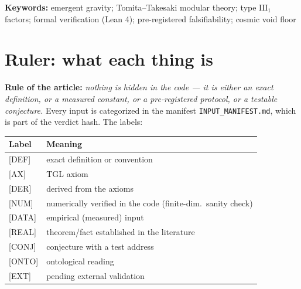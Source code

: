 \documentclass[11pt]{article}
\theoremstyle{definition}\newtheorem{deriv}{Derivation}
\begin{document}
\noindent\textbf{Keywords:} emergent gravity; Tomita--Takesaki modular theory; type $\mathrm{III}_1$ factors; formal verification (Lean 4); pre-registered falsifiability; cosmic void floor\par\vspace{4pt}

\clearpage\tableofcontents\clearpage

\section*{Ruler: what each thing is}

\noindent\textbf{Rule of the article:} \emph{nothing is hidden in the code --- it is either an exact definition, or a measured constant, or a pre-registered protocol, or a testable conjecture.} Every input is categorized in the manifest \texttt{INPUT\_MANIFEST.md}, which is part of the verdict hash. The labels:

\begin{center}\small\begin{tabular}{ll}\toprule

Label & Meaning\\\midrule

\textsf{[DEF]} & exact definition or convention\\

\textsf{[AX]} & TGL axiom\\

\textsf{[DER]} & derived from the axioms\\

\textsf{[NUM]} & numerically verified in the code (finite-dim.\ sanity check)\\

\textsf{[DATA]} & empirical (measured) input\\

\textsf{[REAL]} & theorem/fact established in the literature\\

\textsf{[CONJ]} & conjecture with a test address\\

\textsf{[ONTO]} & ontological reading\\

\textsf{[EXT]} & pending external validation\\\bottomrule

\end{tabular}\end{center}
\end{document}
